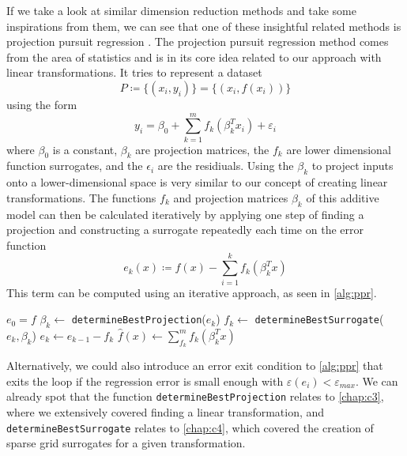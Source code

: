 \documentclass[
  a4paper,  %
  twoside,  %
  bibliography=totoc,
  headsepline,
  cleardoublepage=empty,
  parskip=half,
  draft=false
]{scrbook}
\begin{document}
If we take a look at similar dimension reduction methods and take some inspirations from them, we can see that one of these insightful related methods is projection pursuit regression \cite{huber1985projection}.
The projection pursuit regression method comes from the area of statistics and is in its core idea related to our approach with linear transformations.
It tries to represent a dataset
\begin{equation}
P \coloneqq \{(x_i, y_i)\}=\{(x_i, f(x_i))\}
\end{equation}
using the form
\begin{equation}
y_i=\beta_0 + \sum_{k=1}^m f_k(\beta_k^T x_i) + \varepsilon_i
\label{eq:ppr}
\end{equation}
where $\beta_0$ is a constant, $\beta_k$ are projection matrices, the $f_k$ are lower dimensional function surrogates, and the $\epsilon_i$ are the residiuals.
Using the $\beta_k$ to project inputs onto a lower-dimensional space is very similar to our concept of creating linear transformations.
The functions $f_k$ and projection matrices $\beta_k$ of this additive model can then be calculated iteratively by applying one step of finding a projection and constructing a surrogate repeatedly each time on the error function
\begin{equation}
e_k(x) \coloneqq f(x) - \sum_{i=1}^k f_k(\beta_k^T x)
\end{equation}
%
This term can be computed using an iterative approach, as seen in \cref{alg:ppr}.

\begin{mdframed}[style=algstyle,frametitle={\textbf{function} \texttt{projectionPursuitRegression}{$(f, k_{\text{max}})$}}]
\normalsize
\vspace{5.5mm}
\begin{algorithmic}[1]

    \State $e_0 = f$
    	\State $\beta_k \gets$ \texttt{determineBestProjection}($e_k$)
    	\State $f_k \gets$ \texttt{determineBestSurrogate}($e_k, \beta_k$)
    	\State $e_k \gets e_{k - 1} - f_k$
    \EndFor
    \State $\hat{f}(x) \gets \sum_{f_k}^m f_k(\beta_k^T x)$
    \State {}
\end{algorithmic}

\vspace{-1.5mm}
\delimit

	\label{alg:ppr}
\end{mdframed}
%
Alternatively, we could also introduce an error exit condition to \cref{alg:ppr} that exits the loop if the regression error is small enough with $\varepsilon(e_i) < \varepsilon_{max}$.
We can already spot that the function \texttt{determineBestProjection} relates to \cref{chap:c3}, where we extensively covered finding a linear transformation, and \texttt{determineBestSurrogate} relates to \cref{chap:c4}, which covered the creation of sparse grid surrogates for a given transformation.
\end{document}
